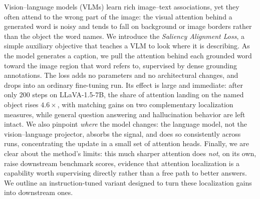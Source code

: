 Vision--language models (VLMs) learn rich image--text associations, yet they often attend to the wrong part of the image: the visual attention behind a generated word is noisy and tends to fall on background or image borders rather than the object the word names. We introduce the \emph{Saliency Alignment Loss}, a simple auxiliary objective that teaches a VLM to look where it is describing. As the model generates a caption, we pull the attention behind each grounded word toward the image region that word refers to, supervised by dense grounding annotations. The loss adds no parameters and no architectural changes, and drops into an ordinary fine-tuning run. Its effect is large and immediate: after only $200$ steps on LLaVA-1.5-7B, the share of attention landing on the named object rises $4.6{\times}$, with matching gains on two complementary localization measures, while general question answering and hallucination behavior are left intact. We also pinpoint \emph{where} the model changes: the language model, not the vision--language projector, absorbs the signal, and does so consistently across runs, concentrating the update in a small set of attention heads. Finally, we are clear about the method's limits: this much sharper attention does \emph{not}, on its own, raise downstream benchmark scores, evidence that attention localization is a capability worth supervising directly rather than a free path to better answers. We outline an instruction-tuned variant designed to turn these localization gains into downstream ones.

